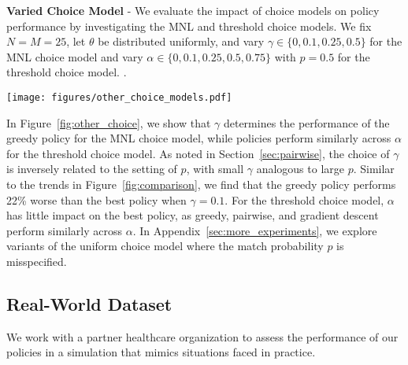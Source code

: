 \begin{example}
\label{ex:choice_model}
    \textbf{Varied Choice Model} - 
We evaluate the impact of choice models on policy performance by investigating the MNL and threshold choice models. 
We fix $N=M=25$, let $\theta$ be distributed uniformly, and vary $\gamma \in \{0,0.1,0.25,0.5\}$ for the MNL choice model and vary  $\alpha \in \{0,0.1,0.25,0.5,0.75\}$ with $p=0.5$ for the threshold choice model. . 

\begin{figure*}
    \centering 
    \texttt{[image: figures/other\_choice\_models.pdf]}
    \caption{We compare policy performances when varying the exit option $\gamma$ for the MNL choice model, and the threshold $\alpha$ for the threshold choice model. 
    For the MNL choice model, when $\gamma$ is small, the greedy policy performs poorly, while for large $\gamma$, all non-random policies perform similarly. For the threshold choice model, all policies perform similarly across choices of $\alpha$.}
    \label{fig:other_choice}
\end{figure*}

In Figure~\ref{fig:other_choice}, we show that $\gamma$ determines the performance of the greedy policy for the MNL choice model, while policies perform similarly across $\alpha$ for the threshold choice model. 
As noted in Section~\ref{sec:pairwise}, the choice of $\gamma$ is inversely related to the setting of $p$, with small $\gamma$ analogous to large $p$. Similar to the trends in Figure~\ref{fig:comparison}, we find that the greedy policy performs 22\% worse than the best policy when $\gamma=0.1$. 
For the threshold choice model,  $\alpha$ has little impact on the best policy, as greedy, pairwise, and gradient descent perform similarly across $\alpha$. 
In Appendix~\ref{sec:more_experiments}, we explore variants of the uniform choice model where the match probability $p$ is misspecified.  

\end{example}

\subsection{Real-World Dataset}
We work with a partner healthcare organization to assess the performance of our policies in a simulation that mimics situations faced in practice. 

